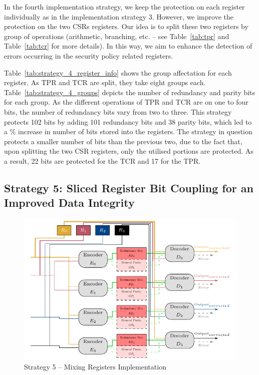In the fourth implementation strategy, we keep the protection on each register individually as in the implementation strategy 3. However, we improve the protection on the two CSRs registers. Our idea is to split these two registers by group of operations (arithmetic, branching, etc. -- see Table~\ref{tab:tpr} and Table~\ref{tab:tcr} for more details). In this way, we aim to enhance the detection of errors occurring in the security policy related registers.

Table~\ref{tab:strategy_4_register_info} shows the group affectation for each register. As TPR and TCR are split, they take eight groups each.
Table~\ref{tab:strategy_4_groups} depicts the number of redundancy and parity bits for each group. As the different operations of TPR and TCR are on one to four bits, the number of redundancy bits vary from two to three. This strategy protects 102 bits by adding 101 redundancy bits and 38 parity bits, which led to a \% increase in number of bits stored into the registers. The strategy in question protects a smaller number of bits than the previous two, due to the fact that, upon splitting the two CSR registers, only the utilised portions are protected. As a result, 22 bits are protected for the TCR and 17 for the TPR.

\subsection{Strategy 5: Sliced Register Bit Coupling for an Improved Data Integrity}

\begin{figure}[ht]
    \centering
    \includegraphics[page=1]{c6_group_composition/img/implem5_spaghetti.pdf}
    \caption{Strategy 5 -- Mixing Registers Implementation}
    \label{fig:strategy_5_functionning}
\end{figure}


